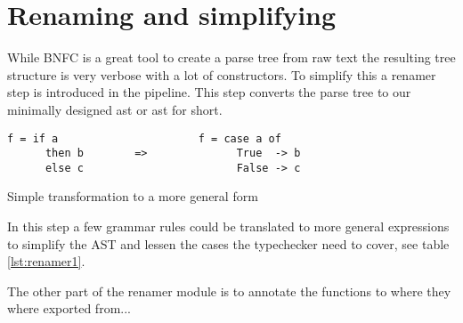 \section{Renaming and simplifying}


While BNFC is a great tool to create a parse tree from raw text the resulting 
tree structure is very verbose with a lot of constructors. To simplify this a
renamer step is introduced in the pipeline. This step converts the parse tree
to our minimally designed \acrlong{ast} or \acrshort{ast} for short. 

\begin{table}
\begin{lstlisting} 
f = if a                      f = case a of
      then b        =>              True  -> b
      else c                        False -> c
\end{lstlisting}
\caption{Simple transformation to a more general form}
\label{lst:renamer1}
\end{table}

In this step a few grammar rules could be translated to more general expressions
to simplify the AST and lessen the cases the typechecker need to cover, see
table \ref{lst:renamer1}.

The other part of the renamer module is to annotate the functions to where they
where exported from...
